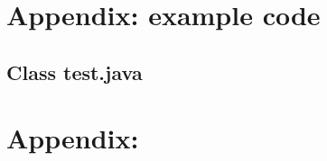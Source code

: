 \documentclass[letterpaper,twocolumn,10pt]{article}
\begin{document}

{\footnotesize 

}


\vfill
\break


\onecolumn
\appendix
\label{app:appendixA}
\lstset{language=Java}  
\section{Appendix: example code}

\subsection{Class test.java}


\label{app:appendixB}
\section{Appendix:}


\end{document}
